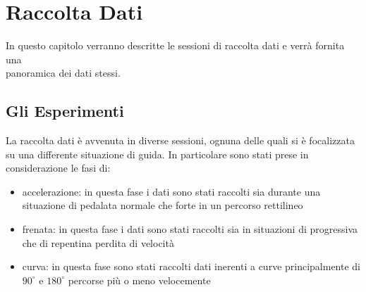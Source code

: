 \documentclass[class=article]{standalone}
\begin{document}
	\section{Raccolta Dati}
	In questo capitolo verranno descritte le sessioni di raccolta dati e verrà fornita una \\panoramica dei dati stessi.
	
	\subsection{Gli Esperimenti}
	La raccolta dati è avvenuta in diverse sessioni, ognuna delle quali si è focalizzata su una differente situazione di guida. In particolare sono stati prese in considerazione le fasi di:
	\begin{itemize}
		\item accelerazione: in questa fase i dati sono stati raccolti sia durante una situazione di pedalata normale che forte in un percorso rettilineo
		\item frenata: in questa fase i dati sono stati raccolti sia in situazioni di progressiva che di repentina perdita di velocità
		\item curva: in questa fase sono stati raccolti dati inerenti a curve principalmente di \(90^\circ\) e \(180^\circ\) percorse più o meno velocemente
	\end{itemize}
	
\end{document}
